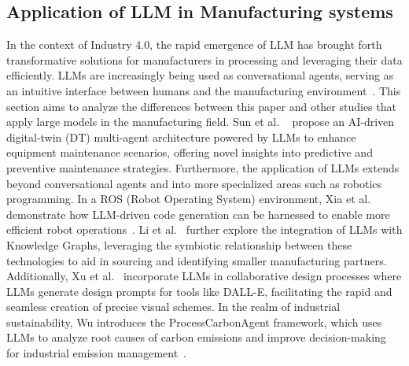 \documentclass[preprint,12pt]{elsarticle}
\providecommand{\DIFaddend}{} %
\DeclareRobustCommand{\DIFaddend}{\DIFOaddend \let\includegraphics\DIFOincludegraphics} %
\begin{document}
\DIFaddend \subsection{Application of LLM in Manufacturing systems}
In the context of Industry 4.0, the rapid emergence of LLM has brought forth transformative solutions for manufacturers in processing and leveraging their data efficiently. 
LLMs are increasingly being used as conversational agents, serving as an intuitive interface between humans and the manufacturing environment~\cite{colabianchi2023human}. 
This section aims to analyze the differences between this paper and other studies that apply large models in the manufacturing field.
Sun et al. ~\cite{sun2024empowering} propose an AI-driven digital-twin (DT) multi-agent architecture powered by LLMs to enhance equipment maintenance scenarios, offering novel insights into predictive and preventive maintenance strategies. 
Furthermore, the application of LLMs extends beyond conversational agents and into more specialized areas such as robotics programming. In a ROS (Robot Operating System) environment, Xia et al. demonstrate how LLM-driven code generation can be harnessed to enable more efficient robot operations~\cite{XIA2024102728}. 
Li et al.~\cite{li2024building} further explore the integration of LLMs with Knowledge Graphs, leveraging the symbiotic relationship between these technologies to aid in sourcing and identifying smaller manufacturing partners. 
Additionally, Xu et al.~\cite{xu2024llm} incorporate LLMs in collaborative design processes where LLMs generate design prompts for tools like DALL-E, facilitating the rapid and seamless creation of precise visual schemes.
In the realm of industrial sustainability, Wu introduces the ProcessCarbonAgent framework, which uses LLMs to analyze root causes of carbon emissions and improve decision-making for industrial emission management~\cite{wu2024processcarbonagent}. 
\end{document}
